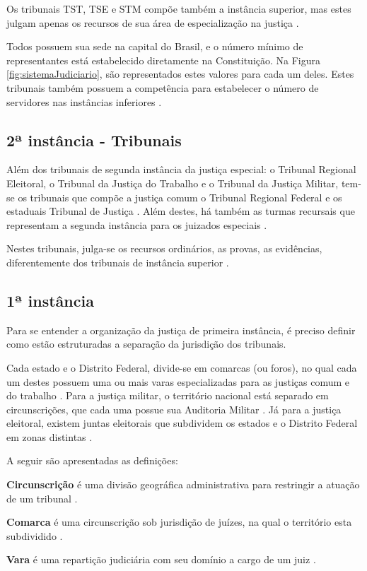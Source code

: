 Os tribunais TST, TSE e STM compõe também a instância superior, mas estes julgam apenas os recursos de sua área de especialização na justiça \cite{BRASIL1988}.

Todos possuem sua sede na capital do Brasil, e o número mínimo de representantes está estabelecido diretamente na Constituição. Na Figura \ref{fig:sistemaJudiciario}, são representados estes valores para cada um deles. Estes tribunais também possuem a competência para estabelecer o número de servidores nas instâncias inferiores \cite{BRASIL1988}.

\subsection{2ª instância - Tribunais}

Além dos tribunais de segunda instância da justiça especial: o Tribunal Regional Eleitoral, o Tribunal da Justiça do Trabalho e o Tribunal da Justiça Militar, tem-se os tribunais que compõe a justiça comum o Tribunal Regional Federal e os estaduais Tribunal de Justiça \cite{BRASIL1988}. Além destes, há também as turmas recursais que representam a segunda instância para os juizados especiais \cite{BRASIL2012}.

Nestes tribunais, julga-se os recursos ordinários, as provas, as evidências, diferentemente dos tribunais de instância superior \cite{JUNIOR2012}.

\subsection{1ª instância}

Para se entender a organização da justiça de primeira instância, é preciso definir como estão estruturadas a separação da jurisdição dos tribunais.

Cada estado e o Distrito Federal, divide-se em comarcas (ou foros), no qual cada um destes possuem uma ou mais varas especializadas  para as justiças comum e do trabalho \cite{JUNIOR2012}. Para a justiça militar, o território nacional está separado em circunscrições, que cada uma possue sua Auditoria Militar \cite{BRASIL1992}. Já para a justiça eleitoral, existem juntas eleitorais que subdividem os estados e o Distrito Federal em zonas distintas \cite{BRASIL1988}.

A seguir são apresentadas as definições:

\begin{description}
	\item \textbf{Circunscrição} é uma divisão geográfica administrativa para restringir a atuação de um tribunal \cite[p. 71]{GUIMARAES2012}.
	\item \textbf{Comarca} é uma circunscrição sob jurisdição de juízes, na qual o território esta subdividido \cite[p. 75]{GUIMARAES2012}.
    \item \textbf{Vara} é uma repartição judiciária com seu domínio a cargo de um juiz \cite[p. 259]{GUIMARAES2012}.
\end{description}


